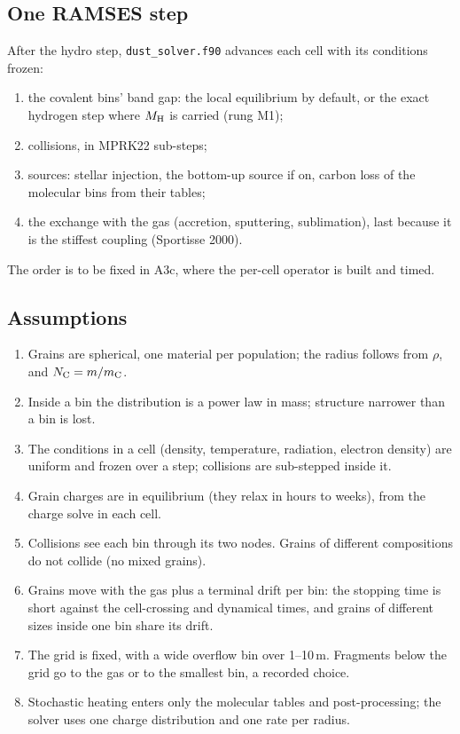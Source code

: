 \documentclass[11pt,a4paper]{article}
\newcommand{\NC}{N_{\rm C}}
\newcommand{\MH}{M_{\rm H}}
\begin{document}
\subsection{One RAMSES step}
After the hydro step, \texttt{dust\_solver.f90} advances each cell with its conditions frozen:
\begin{enumerate}
\item the covalent bins' band gap: the local equilibrium by default, or the exact hydrogen step where $\MH$ is
  carried (rung M1);
\item collisions, in MPRK22 sub-steps;
\item sources: stellar injection, the bottom-up source if on, carbon loss of the molecular bins from their tables;
\item the exchange with the gas (accretion, sputtering, sublimation), last because it is the stiffest coupling
  (Sportisse 2000).
\end{enumerate}
The order is to be fixed in A3c, where the per-cell operator is built and timed.

\subsection{Assumptions}
\begin{enumerate}
\item Grains are spherical, one material per population; the radius follows from $\rho$, and $\NC = m/m_{\rm C}$.
\item Inside a bin the distribution is a power law in mass; structure narrower than a bin is lost.
\item The conditions in a cell (density, temperature, radiation, electron density) are uniform and frozen over a step;
  collisions are sub-stepped inside it.
\item Grain charges are in equilibrium (they relax in hours to weeks), from the charge solve in each cell.
\item Collisions see each bin through its two nodes. Grains of different compositions do not collide (no mixed grains).
\item Grains move with the gas plus a terminal drift per bin: the stopping time is short against the cell-crossing and
  dynamical times, and grains of different sizes inside one bin share its drift.
\item The grid is fixed, with a wide overflow bin over 1--10\,\textmu m. Fragments below the grid go to the gas or to the smallest
  bin, a recorded choice.
\item Stochastic heating enters only the molecular tables and post-processing; the solver uses one charge distribution
  and one rate per radius.
\end{enumerate}
\end{document}
